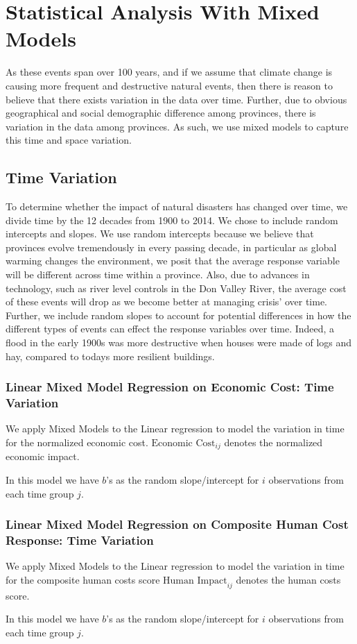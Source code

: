 \section{Statistical Analysis With Mixed Models}
As these events span over 100 years, and if we assume that climate change is causing more frequent and destructive natural events, then there is reason to believe that there exists variation in the data over time. Further, due to obvious geographical and social demographic difference among provinces, there is variation in the data among provinces. As such, we use mixed models to capture this time and space variation.

\subsection{Time Variation}
To determine whether the impact of natural disasters has changed over time, we divide time by the 12 decades from 1900 to 2014.
We chose to include random intercepts and slopes.
We use random intercepts because we believe that provinces evolve tremendously in every passing decade, in particular as global warming changes the environment, we posit that the average response variable will be different across time within a province. Also, due to advances in technology, such as river level controls in the Don Valley River, the average cost of these events will drop as we become better at managing crisis' over time.
Further, we include random slopes to account for potential differences in how the different types of events can effect the response variables over time. Indeed, a flood in the early 1900s was more destructive when houses were made of logs and hay, compared to todays more resilient buildings. 



\subsubsection{Linear Mixed Model Regression on Economic Cost: Time Variation}
We apply Mixed Models to the Linear regression to model the variation in time for the normalized economic cost. $\text{Economic Cost}_{ij}$ denotes the normalized economic impact.

In this model we have $b$'s as the random slope/intercept for $i$ observations from each time group $j$.
\subsubsection{Linear Mixed Model Regression on Composite Human Cost Response: Time Variation}
We apply Mixed Models to the Linear regression to model the variation in time for the composite human costs score $\text{Human Impact}_{ij}$ denotes the human costs score.

In this model we have $b$'s as the random slope/intercept for $i$ observations from each time group $j$.

